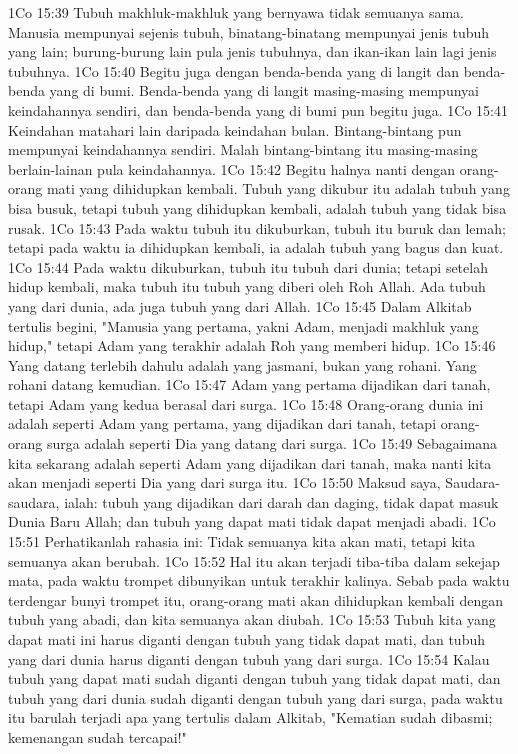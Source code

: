 1Co 15:39  Tubuh makhluk-makhluk yang bernyawa tidak semuanya sama. Manusia mempunyai sejenis tubuh, binatang-binatang mempunyai jenis tubuh yang lain; burung-burung lain pula jenis tubuhnya, dan ikan-ikan lain lagi jenis tubuhnya.
1Co 15:40  Begitu juga dengan benda-benda yang di langit dan benda-benda yang di bumi. Benda-benda yang di langit masing-masing mempunyai keindahannya sendiri, dan benda-benda yang di bumi pun begitu juga.
1Co 15:41  Keindahan matahari lain daripada keindahan bulan. Bintang-bintang pun mempunyai keindahannya sendiri. Malah bintang-bintang itu masing-masing berlain-lainan pula keindahannya.
1Co 15:42  Begitu halnya nanti dengan orang-orang mati yang dihidupkan kembali. Tubuh yang dikubur itu adalah tubuh yang bisa busuk, tetapi tubuh yang dihidupkan kembali, adalah tubuh yang tidak bisa rusak.
1Co 15:43  Pada waktu tubuh itu dikuburkan, tubuh itu buruk dan lemah; tetapi pada waktu ia dihidupkan kembali, ia adalah tubuh yang bagus dan kuat.
1Co 15:44  Pada waktu dikuburkan, tubuh itu tubuh dari dunia; tetapi setelah hidup kembali, maka tubuh itu tubuh yang diberi oleh Roh Allah. Ada tubuh yang dari dunia, ada juga tubuh yang dari Allah.
1Co 15:45  Dalam Alkitab tertulis begini, "Manusia yang pertama, yakni Adam, menjadi makhluk yang hidup," tetapi Adam yang terakhir adalah Roh yang memberi hidup.
1Co 15:46  Yang datang terlebih dahulu adalah yang jasmani, bukan yang rohani. Yang rohani datang kemudian.
1Co 15:47  Adam yang pertama dijadikan dari tanah, tetapi Adam yang kedua berasal dari surga.
1Co 15:48  Orang-orang dunia ini adalah seperti Adam yang pertama, yang dijadikan dari tanah, tetapi orang-orang surga adalah seperti Dia yang datang dari surga.
1Co 15:49  Sebagaimana kita sekarang adalah seperti Adam yang dijadikan dari tanah, maka nanti kita akan menjadi seperti Dia yang dari surga itu.
1Co 15:50  Maksud saya, Saudara-saudara, ialah: tubuh yang dijadikan dari darah dan daging, tidak dapat masuk Dunia Baru Allah; dan tubuh yang dapat mati tidak dapat menjadi abadi.
1Co 15:51  Perhatikanlah rahasia ini: Tidak semuanya kita akan mati, tetapi kita semuanya akan berubah.
1Co 15:52  Hal itu akan terjadi tiba-tiba dalam sekejap mata, pada waktu trompet dibunyikan untuk terakhir kalinya. Sebab pada waktu terdengar bunyi trompet itu, orang-orang mati akan dihidupkan kembali dengan tubuh yang abadi, dan kita semuanya akan diubah.
1Co 15:53  Tubuh kita yang dapat mati ini harus diganti dengan tubuh yang tidak dapat mati, dan tubuh yang dari dunia harus diganti dengan tubuh yang dari surga.
1Co 15:54  Kalau tubuh yang dapat mati sudah diganti dengan tubuh yang tidak dapat mati, dan tubuh yang dari dunia sudah diganti dengan tubuh yang dari surga, pada waktu itu barulah terjadi apa yang tertulis dalam Alkitab, "Kematian sudah dibasmi; kemenangan sudah tercapai!"
